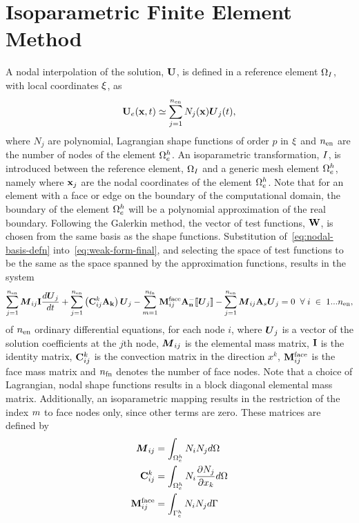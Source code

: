 \section{Isoparametric Finite Element Method}
\label{sec:isoparametric-elements}
A nodal interpolation of the solution, $\mathbf{U}$, is defined in a reference element $\Omega_{I}$, with local coordinates $\mathbf{\xi}$, as
\begin{align}
\mathbf{U}_e(\mathbf{x},t) \simeq \sum_{j=1}^{n_\textrm{en}} N_{j} (\mathbf{x}) \boldsymbol{U}_{j}(t) ,
\label{eq:nodal-basis-defn}
\end{align}
where $N_{j}$ are polynomial, Lagrangian shape functions of order $p$ in $\mathbf{\xi}$ and $n_\textrm{en}$ are the number of nodes of the element $\Omega_e^{h}$. An isoparametric transformation, $I$, is introduced between the reference element, $\Omega_{I}$ and a generic mesh element $\Omega_e^{h}$, namely
where $\mathbf{x}_j$ are the nodal coordinates of the element $\Omega_e^{h}$. Note that for an element with a face or edge on the boundary of the computational domain, the boundary of the element $\Omega_e^{h}$ will be a polynomial approximation of the real boundary\cite{}.
 Following the Galerkin method, the vector of test functions, $\mathbf{W}$, is chosen from the same basis as the shape
functions.
Substitution of~\eqref{eq:nodal-basis-defn} into~\eqref{eq:weak-form-final}, and selecting the space of test functions to be the same as the space spanned by the approximation functions, results in the system
$$
\sum_{j=1}^{n_\textrm{en}} \boldsymbol{M}_{ij} \mathbf{I} \frac{d \boldsymbol{U}_j}{d t} + \sum_{j=1}^{n_\textrm{en}} \left( \mathbf{C}^{k}_{ij} \mathbf{A}_\mathbf{k} \right) \boldsymbol{U}_j - \sum_{m=1}^{n_\textrm{fn}} \mathbf{M}^{\textrm{face}}_{ij} \mathbf{A}_\mathbf{n}^{-} \llbracket \boldsymbol{U}_j \rrbracket - \sum_{j=1}^{n_\textrm{en}} \boldsymbol{M}_{ij} \mathbf{A}_s \boldsymbol{U}_j = 0 \; \; \forall \; i \; \in \; 1...n_\textrm{en},
\label{eq:discretised-weak-form-fem}
$$
of $n_\textrm{en}$ ordinary differential equations, for each node $i$, where $\boldsymbol{U}_j$ is a vector of the solution coefficients at the $j$th node, $\boldsymbol{M}_{ij}$ is the elemental mass matrix, $\mathbf{I}$ is the identity matrix, $\mathbf{C}^{k}_{ij}$ is the convection matrix in the direction $x^{k}$, $\mathbf{M}^{\textrm{face}}_{ij}$ is the face mass matrix and $n_\textrm{fn}$ denotes the number of face nodes. Note that a choice of Lagrangian, nodal shape functions results in a block diagonal elemental mass matrix. Additionally, an isoparametric mapping results in the restriction of the index $m$ to face nodes only, since other terms are zero. These matrices are defined by
\begin{align*}
\boldsymbol{M}_{ij} &= \int_{\Omega_e^{h}} N_i N_j d\Omega \\
\mathbf{C}^{k}_{ij} &= \int_{\Omega_e^{h}} N_i \frac{\partial N_j}{\partial x_{k}}d\Omega \\
\mathbf{M}^{\textrm{face}}_{ij} &= \int_{\Gamma^{h}_e} N_i N_j d\Gamma
\end{align*}

